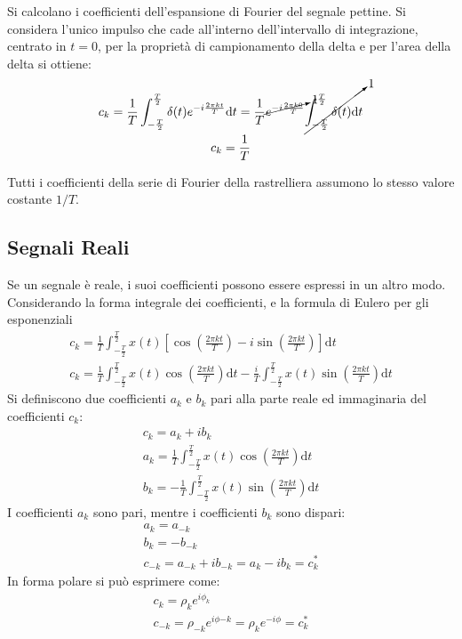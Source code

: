 \documentclass{article}
\newcommand{\df}{\mathrm{d}}
\numberwithin{equation}{subsection}
\begin{document}
Si calcolano i coefficienti dell'espansione di Fourier del segnale pettine. Si considera l'unico impulso che cade all'interno dell'intervallo di integrazione, centrato 
in $t=0$, per la proprietà di campionamento della delta e per l'area della delta si ottiene:
\begin{gather*}
    c_k=\displaystyle\frac{1}{T}\int_{-\frac{T}{2}}^{\frac{T}{2}}\delta(t)e^{-i\frac{2\pi kt}{T}}\df t=\frac{1}{T}\cancelto{1}{e^{-i{\frac{2\pi k0}{T}}}}\cancelto{1}{\int_{-\frac{T}{2}}^{\frac{T}{2}}\delta(t)\df t}\\
    c_k=\displaystyle\frac{1}{T}
\end{gather*}

Tutti i coefficienti della serie di Fourier della rastrelliera assumono lo stesso valore costante $1/T$. 

\subsection{Segnali Reali}
Se un segnale è reale, i suoi coefficienti possono essere espressi in un altro modo. Considerando la forma integrale dei coefficienti, e la formula di Eulero per gli 
esponenziali
\begin{gather*}
    c_k=\displaystyle\frac{1}{T}\int_{-\frac{T}{2}}^{\frac{T}{2}}x(t)\left[\cos\left(\frac{2\pi kt}{T}\right)-i\sin\left(\frac{2\pi kt}{T}\right)\right]\df t\\
    c_k=\displaystyle\frac{1}{T}\int_{-\frac{T}{2}}^{\frac{T}{2}}x(t)\cos\left(\frac{2\pi kt}{T}\right)\df t-\frac{i}{T}\int_{-\frac{T}{2}}^{\frac{T}{2}}x(t)\sin\left(\frac{2\pi kt}{T}\right)\df t
\end{gather*}
Si definiscono due coefficienti $a_k$ e $b_k$ pari alla parte reale ed immaginaria del coefficienti $c_k$:
\begin{gather}
    c_k=a_k+ib_k\\
    a_k=\displaystyle\frac{1}{T}\int_{-\frac{T}{2}}^{\frac{T}{2}}x(t)\cos\left(\frac{2\pi kt}{T}\right)\df t\\
    b_k=\displaystyle-\frac{1}{T}\int_{-\frac{T}{2}}^{\frac{T}{2}}x(t)\sin\left(\frac{2\pi kt}{T}\right)\df t
\end{gather}
I coefficienti $a_k$ sono pari, mentre i coefficienti $b_k$ sono dispari:
\begin{gather*}
    a_k=a_{-k}\\
    b_k=-b_{-k}\\
    c_{-k}=a_{-k}+ib_{-k}=a_{k}-ib_k=c_k^*
\end{gather*}
In forma polare si può esprimere come:
\begin{gather*}
    c_k=\rho_k e^{i\phi_k}\\
    c_{-k}=\rho_{-k}e^{i\phi{-k}}=\rho_k e^{-i\phi}=c_k^*
\end{gather*}
\end{document}

